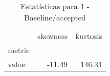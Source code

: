 \begin{table}[htbp]
\caption{Estatísticas para 1 - Baseline/accepted}
\label{tab:1_-_baseline_accepted_skewkurt}
\begin{tabular}{lrr}
\toprule
 & skewness & kurtosis \\
metric &  &  \\
\midrule
value & -11.49 & 146.31 \\
\bottomrule
\end{tabular}
\end{table}
